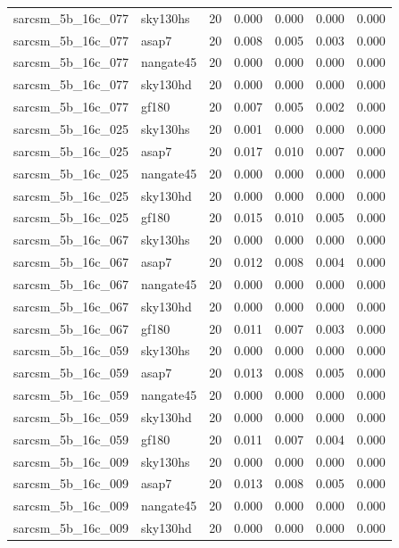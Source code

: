\begin{tabular}{llrrrrr}
sarcsm\_5b\_16c\_077 & sky130hs & 20 & 0.000 & 0.000 & 0.000 & 0.000 \\
sarcsm\_5b\_16c\_077 & asap7 & 20 & 0.008 & 0.005 & 0.003 & 0.000 \\
sarcsm\_5b\_16c\_077 & nangate45 & 20 & 0.000 & 0.000 & 0.000 & 0.000 \\
sarcsm\_5b\_16c\_077 & sky130hd & 20 & 0.000 & 0.000 & 0.000 & 0.000 \\
sarcsm\_5b\_16c\_077 & gf180 & 20 & 0.007 & 0.005 & 0.002 & 0.000 \\
sarcsm\_5b\_16c\_025 & sky130hs & 20 & 0.001 & 0.000 & 0.000 & 0.000 \\
sarcsm\_5b\_16c\_025 & asap7 & 20 & 0.017 & 0.010 & 0.007 & 0.000 \\
sarcsm\_5b\_16c\_025 & nangate45 & 20 & 0.000 & 0.000 & 0.000 & 0.000 \\
sarcsm\_5b\_16c\_025 & sky130hd & 20 & 0.000 & 0.000 & 0.000 & 0.000 \\
sarcsm\_5b\_16c\_025 & gf180 & 20 & 0.015 & 0.010 & 0.005 & 0.000 \\
sarcsm\_5b\_16c\_067 & sky130hs & 20 & 0.000 & 0.000 & 0.000 & 0.000 \\
sarcsm\_5b\_16c\_067 & asap7 & 20 & 0.012 & 0.008 & 0.004 & 0.000 \\
sarcsm\_5b\_16c\_067 & nangate45 & 20 & 0.000 & 0.000 & 0.000 & 0.000 \\
sarcsm\_5b\_16c\_067 & sky130hd & 20 & 0.000 & 0.000 & 0.000 & 0.000 \\
sarcsm\_5b\_16c\_067 & gf180 & 20 & 0.011 & 0.007 & 0.003 & 0.000 \\
sarcsm\_5b\_16c\_059 & sky130hs & 20 & 0.000 & 0.000 & 0.000 & 0.000 \\
sarcsm\_5b\_16c\_059 & asap7 & 20 & 0.013 & 0.008 & 0.005 & 0.000 \\
sarcsm\_5b\_16c\_059 & nangate45 & 20 & 0.000 & 0.000 & 0.000 & 0.000 \\
sarcsm\_5b\_16c\_059 & sky130hd & 20 & 0.000 & 0.000 & 0.000 & 0.000 \\
sarcsm\_5b\_16c\_059 & gf180 & 20 & 0.011 & 0.007 & 0.004 & 0.000 \\
sarcsm\_5b\_16c\_009 & sky130hs & 20 & 0.000 & 0.000 & 0.000 & 0.000 \\
sarcsm\_5b\_16c\_009 & asap7 & 20 & 0.013 & 0.008 & 0.005 & 0.000 \\
sarcsm\_5b\_16c\_009 & nangate45 & 20 & 0.000 & 0.000 & 0.000 & 0.000 \\
sarcsm\_5b\_16c\_009 & sky130hd & 20 & 0.000 & 0.000 & 0.000 & 0.000 \\

\end{tabular}
